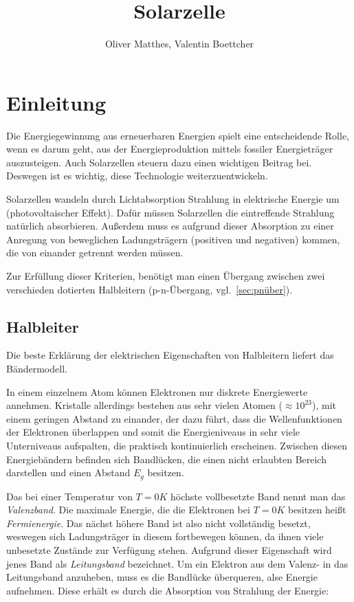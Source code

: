\documentclass[slug=SZ, room=Hermann-Krone-Bau\,\ Labor\ 1.25,
supervisor=Martin\ Kroll, coursedate=14.\ 11.\ 2019]{../../Lab_Report_LaTeX/lab_report}
\title{Solarzelle}
\author{Oliver Matthes, Valentin Boettcher}
\begin{document}
\maketitle

\section{Einleitung}
\label{sec:einl}

Die Energiegewinnung aus erneuerbaren Energien spielt eine entscheidende Rolle, wenn es darum geht,
aus der Energieproduktion mittels fossiler Energieträger auszusteigen.
Auch Solarzellen steuern dazu einen wichtigen Beitrag bei. Deswegen ist es wichtig, diese
Technologie weiterzuentwickeln.

Solarzellen wandeln durch Lichtabsorption Strahlung in elektrische Energie um (photovoltaischer Effekt).
Dafür müssen Solarzellen die eintreffende Strahlung natürlich absorbieren.
Außerdem muss es aufgrund dieser Absorption zu einer Anregung von beweglichen Ladungsträgern
(positiven und negativen) kommen, die von einander getrennt werden müssen.

Zur Erfüllung dieser Kriterien, benötigt man einen Übergang zwischen zwei verschieden dotierten
Halbleitern (p-n-Übergang, vgl.~\ref{sec:pnüber}).

\subsection{Halbleiter}
\label{sec:halbleiter}

Die beste Erklärung der elektrischen Eigenschaften von Halbleitern liefert das Bändermodell.

In einem einzelnem Atom können Elektronen nur diskrete Energiewerte annehmen.
Kristalle allerdings bestehen aus sehr vielen Atomen (\(\approx 10^{23}\)), mit einem geringen Abstand zu einander,
der dazu führt, dass die Wellenfunktionen der Elektronen überlappen und somit die Energieniveaus in sehr
viele Unterniveaus aufspalten, die praktisch kontinuierlich erscheinen.
Zwischen diesen Energiebändern befinden sich Bandlücken, die einen nicht erlaubten Bereich darstellen und
einen Abstand \(E_g\) besitzen.

Das bei einer Temperatur von \(T=0 K\) höchste vollbesetzte Band nennt
man das \emph{Valenzband}.  Die maximale Energie, die die Elektronen
bei \(T=0 K\) besitzen hei\ss{}t \emph{Fermienergie}. Das nächst
höhere Band ist also nicht vollständig besetzt, weswegen sich
Ladungsträger in diesem fortbewegen können, da ihnen viele unbesetzte
Zustände zur Verfügung stehen.  Aufgrund dieser Eigenschaft wird jenes
Band als \emph{Leitungsband} bezeichnet.  Um ein Elektron aus dem
Valenz- in das Leitungsband anzuheben, muss es die Bandlücke
überqueren, alse Energie aufnehmen. Diese erhält es durch die
Absorption von Strahlung der Energie:
\end{document}
